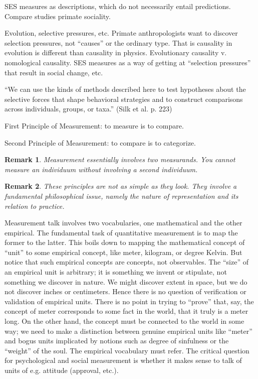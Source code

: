 \documentclass[11pt,twoside]{article}
\newtheorem{remark}{Remark}
\begin{document}
SES measures as descriptions, which do not necessarily entail
predictions.  Compare studies primate sociality.

Evolution, selective pressures, etc.  Primate anthropologists want to
discover selection pressures, not ``causes'' or the ordinary type.
That is causality in evolution is different than causality in physics.
Evolutionary causality v. nomological causality.  SES measures as a
way of getting at ``selection pressures'' that result in social
change, etc.

``We can use the kinds of methods described here to test hypotheses
about the selective forces that shape behavioral strategies and to
construct comparisons across individuals, groups, or taxa.'' (Silk
et al. p. 223)

First Principle of Measurement: to measure is to compare.

Second Principle of Measurement:  to compare is to categorize.

\begin{remark}
  Measurement essentially involves two measurands.  You cannot measure
  an individuum without involving a second individuum.
\end{remark}

\begin{remark}
  These principles are not as simple as they look.  They involve a
  fundamental philosophical issue, namely the nature of representation
  and its relation to practice.
\end{remark}

Measurement talk involves two vocabularies, one mathematical and the
other empirical.  The fundamental task of quantitative measurement is
to map the former to the latter.  This boils down to mapping the
mathematical concept of ``unit'' to some empirical concept, like
meter, kilogram, or degree Kelvin.  But notice that such empirical
concepts are concepts, not observables.  The ``size'' of an empirical
unit is arbitrary; it is something we invent or stipulate, not
something we discover in nature.  We might discover extent in space,
but we do not discover inches or centimeters.  Hence there is no
question of verification or validation of empirical units.  There is
no point in trying to ``prove'' that, say, the concept of meter
corresponds to some fact in the world, that it truly is a meter long.
On the other hand, the concept must be connected to the world in some
way; we need to make a distinction between genuine empirical units
like ``meter'' and bogus units implicated by notions such as degree of
sinfulness or the ``weight'' of the soul.  The empirical vocabulary
must refer.  The critical question for psychological and social
measurement is whether it makes sense to talk of units of
e.g. attitude (approval, etc.).
\end{document}
